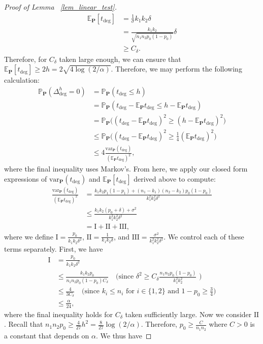 \documentclass{article}
\newcommand{\bbP}{\mathbb{P}}
\newcommand{\bP}{\mathbf{P}}
\newcommand{\EE}{\mathbb{E}}
\newcommand{\var}{\textrm{var}}
\newcommand{\lin}{\text{deg}}
\begin{document}
\begin{proof}[Proof of Lemma ~\ref{lem_linear_test}]
    \begin{align*}
        \EE_\bP[t_\lin] &= \frac{1}{\sigma}k_1k_2 \delta \\
        &= \frac{k_1k_2}{\sqrt{n_1n_2p_0(1-p_0)}}\delta \\
        &\geq C_\delta.
    \end{align*}
    Therefore, for $C_\delta$ taken large enough, we can ensure that $\EE_\bP[t_\lin] \geq 2h = 2\sqrt{4 \log(2/\alpha)}$. Therefore, we may perform the following calculation:
    \begin{align*}
        \bbP_\bP(\Delta_\lin^h = 0) &= \bbP_\bP(t_\lin \leq h) \\
        &= \bbP_\bP(t_\lin - \EE_\bP t_\lin \leq h - \EE_\bP t_\lin) \\
        &= \bbP_\bP\big((t_\lin - \EE_\bP t_\lin)^2 \geq (h - \EE_\bP t_\lin)^2\big) \\
        &\leq \bbP_\bP\big((t_\lin - \EE_\bP t_\lin)^2 \geq \frac14(\EE_\bP t_\lin)^2\big) \\
        &\leq 4\frac{\var_\bP(t_\lin)}{(\EE_\bP t_\lin)^2},
    \end{align*}
    where the final inequality uses Markov's. From here, we apply our closed form expressions of $\var_\bP(t_\lin)$ and $\EE_\bP [t_\lin]$ derived above to compute:
    \begin{align*}
        \frac{\var_\bP(t_\lin)}{(\EE_\bP t_\lin)^2} &= \frac{k_1k_2 p_1(1 - p_1) + (n_1 - k_1)(n_2 - k_2)p_0(1 - p_0)}{k_1^2k_2^2\delta^2} \\
        &\leq \frac{k_1k_2(p_0 + \delta) + \sigma^2}{k_1^2k_2^2\delta^2} \\
        &= \text{I} + \text{II} + \text{III} ,  
\end{align*}
where we define $\text{I} = \frac{p_0}{k_1k_2\delta^2}$, $\text{II} = \frac{1}{k_1k_2\delta}$, and $\text{III} = \frac{\sigma^2}{k^2_1k^2_2 \delta^2}$. We control each of these terms separately. First, we have
\begin{align*}
    \text{I} &= \frac{p_0}{k_1k_2\delta^2} \\
    &\leq \frac{k_1k_2 p_0}{n_1n_2p_0(1-p_0)C_\delta} \quad \text{(since $\delta^2 \geq C_\delta\frac{n_1n_2p_0(1 - p_0)}{k^2_1k^2_2}$ )} \\
    &\leq \frac{4}{3C_\delta} \quad \text{(since $k_i \leq n_i$ for $i \in \{1,2\}$ and $1 - p_0 \geq \frac34$)} \\
    &\leq \frac{\alpha}{24},
\end{align*}
where the final inequality holds for $C_\delta$ taken sufficiently large. Now we consider $\text{II}$. Recall that $n_1 n_2 p_0 \geq \frac{4}{27} h^2 = \frac{8}{27}\log(2/\alpha)$. Therefore, $p_0 \geq \frac{C}{n_1n_2}$ where $C > 0$ is a constant that depends on $\alpha$. We thus have

\end{proof}
\end{document}
